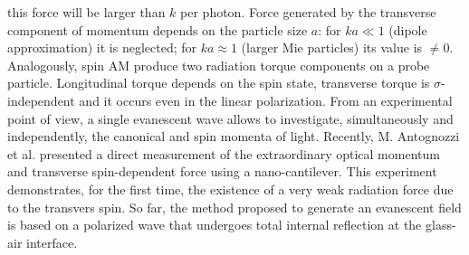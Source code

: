 \documentclass[journal=apchd5,manuscript=article]{achemso}
\begin{document}
this force will be larger than $k$ per photon. Force generated by the transverse component of momentum depends on the particle size $a$: for $ka\ll1$ (dipole approximation) it is neglected; for $ka\approx1$ (larger Mie particles) its value is $\neq0$. Analogously, spin AM produce two radiation torque components on a probe particle. Longitudinal torque depends on the spin state, transverse torque is $\sigma$-independent and it occurs even in the linear polarization. From an experimental point of view, a single evanescent wave allows to investigate, simultaneously and independently, the canonical and spin momenta of light. Recently, M. Antognozzi et al. presented a direct measurement of the extraordinary optical momentum and transverse spin-dependent force using a nano-cantilever. This experiment demonstrates, for the first time, the existence of a very weak radiation force due to the transvers spin. So far, the method proposed to generate an evanescent field is based on a polarized wave that undergoes total internal reflection at the glass-air interface. 
%
%
\end{document}
